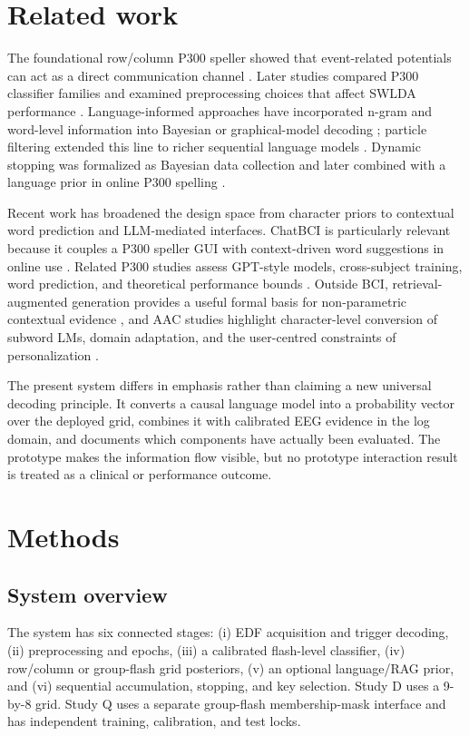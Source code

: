 \documentclass[final,5p,times,twocolumn,authoryear]{elsarticle}
\begin{document}
\section{Related work}
The foundational row/column P300 speller showed that event-related potentials can act as a direct communication channel \citep{farwell1988,mcfarland2011bci}. Later studies compared P300 classifier families and examined preprocessing choices that affect SWLDA performance \citep{krusienski2006comparison,krusienski2008}. Language-informed approaches have incorporated n-gram and word-level information into Bayesian or graphical-model decoding \citep{speier2012,orhan2013context,delgado2015}; particle filtering extended this line to richer sequential language models \citep{speier2015particle}. Dynamic stopping was formalized as Bayesian data collection \citep{throckmorton2013bayesian} and later combined with a language prior in online P300 spelling \citep{mainsah2014lm}.

Recent work has broadened the design space from character priors to contextual word prediction and LLM-mediated interfaces. ChatBCI is particularly relevant because it couples a P300 speller GUI with context-driven word suggestions in online use \citep{hong2026chatbci}. Related P300 studies assess GPT-style models, cross-subject training, word prediction, and theoretical performance bounds \citep{parthasarathy2020optimizing,parthasarathy2024evaluation,parthasarathy2026nearoptimal}. Outside BCI, retrieval-augmented generation provides a useful formal basis for non-parametric contextual evidence \citep{lewis2020rag}, and AAC studies highlight character-level conversion of subword LMs, domain adaptation, and the user-centred constraints of personalization \citep{pereira2024praact,gaines2025aac,valencia2023less}.

The present system differs in emphasis rather than claiming a new universal decoding principle. It converts a causal language model into a probability vector over the deployed grid, combines it with calibrated EEG evidence in the log domain, and documents which components have actually been evaluated. The prototype makes the information flow visible, but no prototype interaction result is treated as a clinical or performance outcome.

\section{Methods}
\subsection{System overview}
The system has six connected stages: (i) EDF acquisition and trigger decoding, (ii) preprocessing and epochs, (iii) a calibrated flash-level classifier, (iv) row/column or group-flash grid posteriors, (v) an optional language/RAG prior, and (vi) sequential accumulation, stopping, and key selection. Study D uses a 9-by-8 grid. Study Q uses a separate group-flash membership-mask interface and has independent training, calibration, and test locks.
\end{document}
